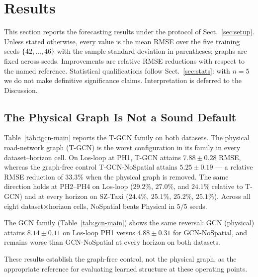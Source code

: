 \section{Results}\label{sec:results}

This section reports the forecasting results under the protocol of
Sect.~\ref{sec:setup}. Unless stated otherwise, every value is the mean RMSE
over the five training seeds $\{42,\dots,46\}$ with the sample standard
deviation in parentheses; graphs are fixed across seeds. Improvements are
relative RMSE reductions with respect to the named reference. Statistical
qualifications follow Sect.~\ref{sec:stats}: with $n=5$ we do not make
definitive significance claims. Interpretation is deferred to the Discussion.

\subsection{The Physical Graph Is Not a Sound Default}\label{sec:res-physical}

Table~\ref{tab:tgcn-main} reports the T-GCN family on both datasets. The
physical road-network graph (T-GCN) is the worst configuration in its family
in every dataset--horizon cell. On Los-loop at PH1, T-GCN attains
$7.88\pm 0.28$ RMSE, whereas the graph-free control T-GCN-NoSpatial attains
$5.25\pm 0.19$ --- a relative RMSE reduction of $33.3\%$ when the physical
graph is removed. The same direction holds at PH2--PH4 on Los-loop
($29.2\%$, $27.0\%$, and $24.1\%$ relative to T-GCN) and at every horizon on
SZ-Taxi ($24.4\%$, $25.1\%$, $25.2\%$, $25.1\%$). Across all eight
dataset$\times$horizon cells, NoSpatial beats Physical in $5/5$ seeds.

The GCN family (Table~\ref{tab:gcn-main}) shows the same reversal: GCN
(physical) attains $8.14\pm 0.11$ on Los-loop PH1 versus $4.88\pm 0.31$ for
GCN-NoSpatial, and remains worse than GCN-NoSpatial at every horizon on both
datasets.

These results establish the graph-free control, not the physical graph, as
the appropriate reference for evaluating learned structure at these operating
points.

